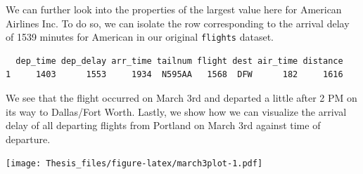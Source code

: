 \documentclass[12pt,twoside]{Mactemplate}
\theoremstyle{definition}
\theoremstyle{definition}
\theoremstyle{definition}
\theoremstyle{remark}
\begin{document}
We can further look into the properties of the largest value here for
American Airlines Inc. To do so, we can isolate the row corresponding to
the arrival delay of 1539 minutes for American in our original
\texttt{flights} dataset.
\begin{Shaded}
\end{Shaded}
\begin{verbatim}
  dep_time dep_delay arr_time tailnum flight dest air_time distance
1     1403      1553     1934  N595AA   1568  DFW      182     1616
\end{verbatim}
We see that the flight occurred on March 3rd and departed a little after
2 PM on its way to Dallas/Fort Worth. Lastly, we show how we can
visualize the arrival delay of all departing flights from Portland on
March 3rd against time of departure.
\begin{Shaded}
\end{Shaded}
\texttt{[image: Thesis\_files/figure-latex/march3plot-1.pdf]}
\end{document}

